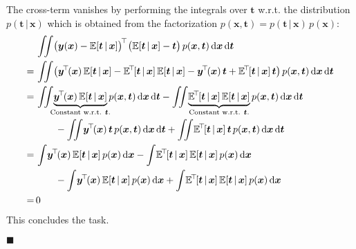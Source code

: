 \documentclass[11pt, a4paper]{scrartcl}
\newcommand{\E}{\mathbb{E}}
\newcommand{\transposed}{{\!\top\!}}
\renewcommand{\vec}[1]{\bm{#1}}
\newcommand{\given}{\,\vert\,}
\newcommand{\eot}{\hfill\(\blacksquare\)}
\begin{document}
			The cross-term vanishes by performing the integrals over \(\vec{t}\) w.r.t. the distribution \( p(\vec{t} \given \vec{x}) \) which is obtained from the factorization \( p(\vec{x}, \vec{t}) = p(\vec{t} \given \vec{x}) \, p(\vec{x}) \):
			\begin{align}
				 &\, \iint\! \big( \vec{y}(\vec{x}) - \E[\vec{t} \given \vec{x}] \big)^\transposed \, \big( \E[\vec{t} \given \vec{x}] - \vec{t} \big) \, p(\vec{x}, \vec{t}) \dd{\vec{x}} \dd{\vec{t}} \\
				=&\, \iint\! \big( \vec{y}^\transposed(\vec{x}) \, \E[\vec{t} \given \vec{x}] - \E^\transposed[\vec{t} \given \vec{x}] \, \E[\vec{t} \given \vec{x}] - \vec{y}^\transposed(\vec{x}) \, \vec{t} + \E^\transposed[\vec{t} \given \vec{x}] \, \vec{t} \big) \, p(\vec{x}, \vec{t}) \dd{\vec{x}} \dd{\vec{t}} \\
				=&\, \iint\! \underbrace{\vec{y}^\transposed(\vec{x}) \, \E[\vec{t} \given \vec{x}]}_{\mathclap{\text{Constant w.r.t. \(\vec{t}\).}}} p(\vec{x}, \vec{t}) \dd{\vec{x}} \dd{\vec{t}}
					- \iint\! \underbrace{\E^\transposed[\vec{t} \given \vec{x}] \, \E[\vec{t} \given \vec{x}]}_{\mathclap{\text{Constant w.r.t. \(\vec{t}\).}}} p(\vec{x}, \vec{t}) \dd{\vec{x}} \dd{\vec{t}} \\
				 &\,\qquad
				 	- \iint\! \vec{y}^\transposed(\vec{x}) \, \vec{t} \, p(\vec{x}, \vec{t}) \dd{\vec{x}} \dd{\vec{t}}
					+ \iint\! \E^\transposed[\vec{t} \given \vec{x}] \, \vec{t} \, p(\vec{x}, \vec{t}) \dd{\vec{x}} \dd{\vec{t}} \\
				=&\, \int\! \vec{y}^\transposed(\vec{x}) \, \E[\vec{t} \given \vec{x}] \, p(\vec{x}) \dd{\vec{x}}
					- \int\! \E^\transposed[\vec{t} \given \vec{x}] \, \E[\vec{t} \given \vec{x}] \, p(\vec{x}) \dd{\vec{x}} \\
				 &\,\qquad
					- \int\! \vec{y}^\transposed(\vec{x}) \, \E[\vec{t} \given \vec{x}] \, p(\vec{x}) \dd{\vec{x}}
					+ \int\! \E^\transposed[\vec{t} \given \vec{x}] \, \E[\vec{t} \given \vec{x}] \, p(\vec{x}) \dd{\vec{x}} \\
				=&\, 0
			\end{align}
			This concludes the task.


			\eot
\end{document}
